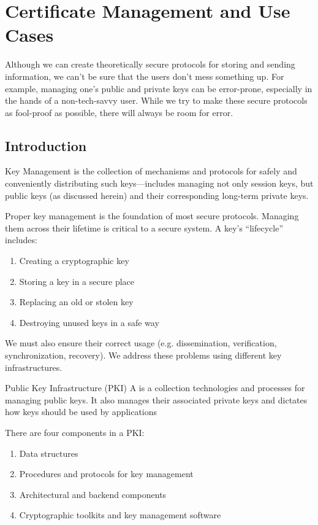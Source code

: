 \chapter{Certificate Management and Use Cases}

Although we can create theoretically secure protocols for storing and sending information, we can't be sure that the users don't mess something up. For example, managing one's public and private keys can be error-prone, especially in the hands of a non-tech-savvy user. While we try to make these secure protocols as fool-proof as possible, there will always be room for error.

\section{Introduction}

\begin{dfnbox}{Key Management}{}
     is the collection of mechanisms and protocols for safely and conveniently distributing such keys—includes managing not only session keys, but public keys (as discussed herein) and their corresponding long-term private keys.
\end{dfnbox}

Proper key management is the foundation of most secure protocols. Managing them across their lifetime is critical to a secure system. A key's ``lifecycle'' includes:

\begin{enumerate}[noitemsep]
    \item Creating a cryptographic key
    \item Storing a key in a secure place
    \item Replacing an old or stolen key
    \item Destroying unused keys in a safe way
\end{enumerate}
We must also ensure their correct usage (e.g. dissemination, verification, synchronization, recovery). We address these problems using different key infrastructures.

\begin{dfnbox}{Public Key Infrastructure (PKI)}{}
    A  is a collection technologies and processes for managing public keys. It also manages their associated private keys and dictates how keys should be used by applications
\end{dfnbox}

There are four components in a PKI:
\begin{enumerate}[noitemsep]
    \item Data structures
    \item Procedures and protocols for key management
    \item Architectural and backend components
    \item Cryptographic toolkits and key management software
\end{enumerate}

